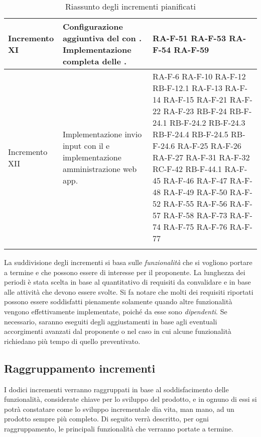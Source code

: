 \begin{center}
\begin{longtable}{|p{2.5cm}|p{6.5cm}|p{6cm}|}
	Incremento XI   & Configurazione aggiuntiva del \glock{gateway} con \glock{Kafka}. Implementazione completa delle \glock{API}. & RA-F-51 RA-F-53 RA-F-54 RA-F-59 \\ \hline
	Incremento XII	& Implementazione invio input con il \glock{bot Telegram} e implementazione amministrazione web app. & RA-F-6 RA-F-10 RA-F-12 RB-F-12.1 RA-F-13 RA-F-14 RA-F-15 RA-F-21 RA-F-22 RA-F-23 RB-F-24 RB-F-24.1 RB-F-24.2 RB-F-24.3 RB-F-24.4 RB-F-24.5 RB-F-24.6 RA-F-25 RA-F-26 RA-F-27 RA-F-31 RA-F-32 RC-F-42 RB-F-44.1 RA-F-45 RA-F-46 RA-F-47 RA-F-48 RA-F-49 RA-F-50 RA-F-52 RA-F-55 RA-F-56 RA-F-57 RA-F-58 RA-F-73 RA-F-74 RA-F-75 RA-F-76 RA-F-77 \\	\hline

	\caption{Riassunto degli incrementi pianificati}
	\end{longtable}
\end{center}
La suddivisione degli incrementi si basa sulle \textit{funzionalità} che si vogliono portare a termine e che possono essere di interesse per il proponente. La lunghezza dei periodi è stata scelta in base al quantitativo di requisiti da convalidare e in base alle attività che devono essere svolte. Si fa notare che molti dei requisiti riportati possono essere soddisfatti pienamente solamente quando altre funzionalità vengono effettivamente implementate, poiché da esse sono \textit{dipendenti}. 
\newline 
Se necessario, saranno eseguiti degli aggiustamenti in base agli eventuali accorgimenti avanzati dal proponente o nel caso in cui alcune funzionalità richiedano più tempo di quello preventivato.



\subsection{Raggruppamento incrementi}

I dodici incrementi verranno raggruppati in base al soddisfacimento delle funzionalità, considerate chiave per lo sviluppo del prodotto, e in ognuno di essi si potrà constatare come lo sviluppo incrementale dia vita, man mano, ad un prodotto sempre più completo. Di seguito verrà descritto, per ogni raggruppamento, le principali funzionalità che verranno portate a termine.


